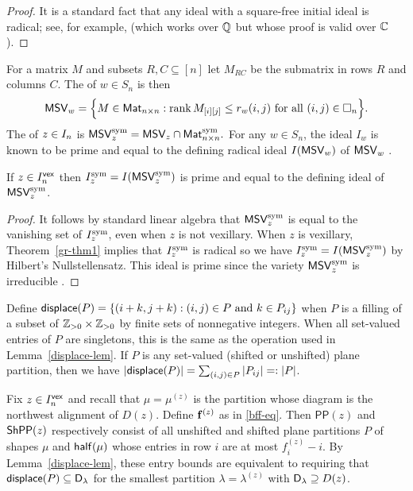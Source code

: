 \documentclass[10pt]{article}
\begin{document}
\begin{proof}
It is a standard fact that any ideal with a square-free initial ideal is radical; see, for example, \cite[Prop.~5.3]{Sturmfels2002} (which works over $\mathbb{Q}$ but whose proof is valid over $\mathbb{C}$).
\end{proof}
 
 For a matrix $M$ and subsets $R,C \subseteq [n]$ let $M_{RC}$ be the submatrix in rows $R$ and columns $C$.
The   of $w \in S_n$
is then
\[\label{eq:MX-defn}
    \mathsf{MSV}_w = \Bigl\{M \in \mathsf{Mat}_{n\times n} : \text{$\operatorname{rank} M_{[i][j]} \leq   r_w(i,j)$ for all $(i,j) \in \square_n$}\Bigr\}. 
\]
The  of $z \in I_n$ is     $\SymMSV_z %
= \MSV_z  \cap \SymMat_{n\times n}.$
For any $w \in S_n$, the   ideal $I_w$ is known to be prime and equal to the defining radical ideal $I(\mathsf{MSV}_w)$ of $\mathsf{MSV}_w$ \cite[\S3.1]{KnutsonMillerYong}.

\begin{corollary}\label{sym-i-msv-cor}
If $z \in I^{\mathsf{vex}}_n$ then $I^{\mathrm{sym}}_z=I(\mathsf{MSV}^{\mathrm{sym}}_z)$ is prime and equal to 
the defining ideal of $\mathsf{MSV}^{\mathrm{sym}}_z$.
\end{corollary}


\begin{proof}
It follows by standard linear algebra that  $\mathsf{MSV}^{\mathrm{sym}}_z$ is equal to the vanishing set of $I^{\mathrm{sym}}_z$, even when $z$ is not vexillary.
When $z$ is vexillary, Theorem~\ref{gr-thm1} implies that $I^{\mathrm{sym}}_z$ is radical so we have $I^{\mathrm{sym}}_z=I(\mathsf{MSV}^{\mathrm{sym}}_z)$ by Hilbert's Nullstellensatz. This ideal is prime since the variety $\mathsf{MSV}^{\mathrm{sym}}_z$ is irreducible \cite[Lem.~5.2]{BagnoCherniavsky2012}.
\end{proof}

 

Define
$\mathsf{displace}(P) = \{ (i+k, j+k) : (i,j) \in P\text{ and }k \in P_{ij}\}$
when $P$ is a filling of a subset of $\mathbb{Z}_{>0}\times \mathbb{Z}_{>0}$ by
finite sets of nonnegative integers.
When all set-valued entries of $P$ are singletons,
this is the same as the operation used in Lemma~\ref{displace-lem}.
If $P$ is any set-valued (shifted or unshifted) plane partition, then we have 
$   |\mathsf{displace}(P)| = \sum_{(i,j) \in P} |P_{ij}| =:  |P|$.

Fix $z \in I^{\mathsf{vex}}_n$ and 
recall 
that $\mu=\mu^{(z)}$ is the partition whose diagram is the northwest alignment of $D(z)$. 
Define $\mathbf{f}^{(z)}$ as in \eqref{bff-eq}. Then
 $\mathsf{PP}(z)$ and $\mathsf{ShPP}(z)$
 respectively
consist of all unshifted and shifted plane partitions $P$ of shapes $\mu$ and $\mathsf{half}(\mu)$ whose entries in row $i$ are at most $f^{(z)}_i - i$.
By Lemma~\ref{displace-lem}, these entry bounds are equivalent to requiring that
$\mathsf{displace}(P)\subseteq \mathsf{D}_\lambda$ for the smallest partition $\lambda =\lambda^{(z)}$ with $\mathsf{D}_\lambda \supseteq D(z)$.
\end{document}
